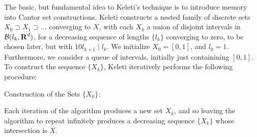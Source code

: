 The basic, but fundamental idea to Keleti's technique is to introduce memory into Cantor set constructions. Keleti constructs a nested family of discrete sets $X_0 \supset X_1 \supset \dots$ converging to $X$, with each $X_k$ a union of disjoint intervals in $\operatorname{\mathcal{B}}(l_k, \operatorname{\mathbf{R}}^d)$, for a decreasing sequence of lengths $\{ l_k \}$ converging to zero, to be chosen later, but with $10 l_{k+1} \mid l_k$. We initialize $X_0 = [0,1]$, and $l_0 = 1$. Furthermore, we consider a queue of intervals, initially just containining $[0,1]$. To construct the sequence $\{ X_k \}$, Keleti iteratively performs the following procedure:
%
\begin{algorithm}[H]
    \begin{algorithmic}%
        \caption{Construction of the Sets $\{ X_k \}$:}
        \MRepeat


            \EndForAll
        \EndRepeat   
    \end{algorithmic}
\end{algorithm}

Each iteration of the algorithm produces a new set $X_k$, and so leaving the algorithm to repeat infinitely produces a decreasing sequence $\{ X_k \}$ whose intersection is $X$.

